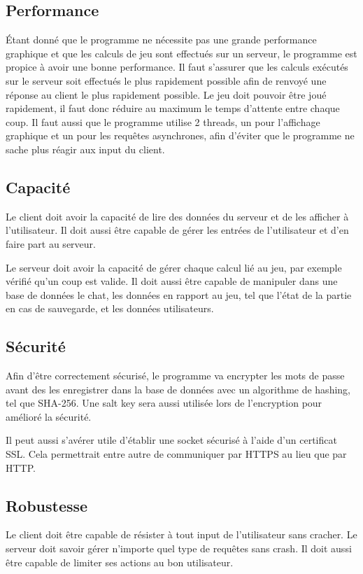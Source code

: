 \documentclass[utf8]{article}
\begin{document}
\subsection{Performance}
Étant donné que le programme ne nécessite pas une grande performance graphique et que les calculs de jeu sont effectués sur un serveur, le
programme est propice à avoir une bonne performance. Il faut s'assurer que les calculs exécutés sur le serveur soit effectués le plus
rapidement possible afin de renvoyé une réponse au client le plus rapidement possible. Le jeu doit pouvoir être joué rapidement, il faut
donc réduire au maximum le temps d'attente entre chaque coup.
Il faut aussi que le programme utilise 2 threads, un pour l'affichage graphique et un pour les requêtes asynchrones, afin d'éviter que le
programme ne sache plus réagir aux input du client.

\subsection{Capacité}
Le client doit avoir la capacité de lire des données du serveur et de les afficher à l'utilisateur. Il doit aussi être capable de gérer les
entrées de l'utilisateur et d'en faire part au serveur.

Le serveur doit avoir la capacité de gérer chaque calcul lié au jeu, par exemple vérifié qu'un coup est valide. Il doit aussi être capable
de manipuler dans une base de données le chat, les données en rapport au jeu, tel que l'état de la partie en cas de sauvegarde, et les 
données utilisateurs.

\subsection{Sécurité}
Afin d'être correctement sécurisé, le programme va encrypter les mots de passe avant des les enregistrer dans la base de données avec un
algorithme de hashing, tel que SHA-256. Une salt key sera aussi utilisée lors de l'encryption pour amélioré la sécurité.

Il peut aussi s'avérer utile d'établir une socket sécurisé à l'aide d'un certificat SSL. Cela permettrait entre autre de communiquer par HTTPS au
lieu que par HTTP.

\subsection{Robustesse}
Le client doit être capable de résister à tout input de l'utilisateur sans cracher.
Le serveur doit savoir gérer n'importe quel type de requêtes sans crash. Il doit aussi être capable de limiter ses actions au bon utilisateur.
\end{document}
